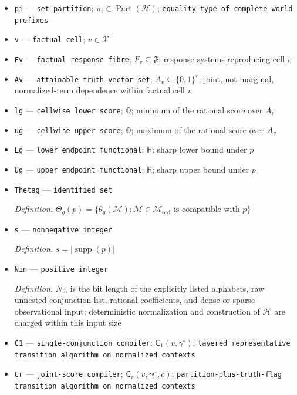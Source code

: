 \documentclass{article}
\begin{document}
\begin{itemize}
  \item \texttt{pi} --- \texttt{set partition}; \(\pi_i\in\operatorname{Part}(\mathcal H)\); \texttt{equality type of complete world prefixes}
  \item \texttt{v} --- \texttt{factual cell}; \(v\in\mathcal X\)
  \item \texttt{Fv} --- \texttt{factual response fibre}; \(F_v\subseteq\mathfrak F\); response systems reproducing cell \(v\)
  \item \texttt{Av} --- \texttt{attainable truth-\allowbreak{}vector set}; \(A_v\subseteq\{0,1\}^r\); joint, not marginal, normalized-term dependence within factual cell \(v\)
  \item \texttt{lg} --- \texttt{cellwise lower score}; \(\mathbb Q\); minimum of the rational score over \(A_v\)
  \item \texttt{ug} --- \texttt{cellwise upper score}; \(\mathbb Q\); maximum of the rational score over \(A_v\)
  \item \texttt{Lg} --- \texttt{lower endpoint functional}; \(\mathbb R\); sharp lower bound under \(p\)
  \item \texttt{Ug} --- \texttt{upper endpoint functional}; \(\mathbb R\); sharp upper bound under \(p\)
  \item \texttt{Thetag} --- \texttt{identified set}
  \par\smallskip\noindent\emph{Definition.} \(\Theta_g(p)=\{\theta_g(\mathcal M):\mathcal M\in\mathcal M_{\mathrm{ord}}\text{ is compatible with }p\}\)
  \item \texttt{s} --- \texttt{nonnegative integer}
  \par\smallskip\noindent\emph{Definition.} \(s=|\operatorname{supp}(p)|\)
  \item \texttt{Nin} --- \texttt{positive integer}
  \par\smallskip\noindent\emph{Definition.} \(N_{\mathrm{in}}\) is the bit length of the explicitly listed alphabets, raw unnested conjunction list, rational coefficients, and dense or sparse observational input; deterministic normalization and construction of \(\mathcal H\) are charged within this input size
  \item \texttt{C1} --- \texttt{single-\allowbreak{}conjunction compiler}; \(\mathsf C_1(v,\gamma^{\circ})\); \texttt{layered representative transition algorithm on normalized contexts}
  \item \texttt{Cr} --- \texttt{joint-\allowbreak{}score compiler}; \(\mathsf C_r(v,\boldsymbol\gamma^{\circ},c)\); \texttt{partition-\allowbreak{}plus-\allowbreak{}truth-\allowbreak{}flag transition algorithm on normalized contexts}

\end{itemize}
\end{document}
